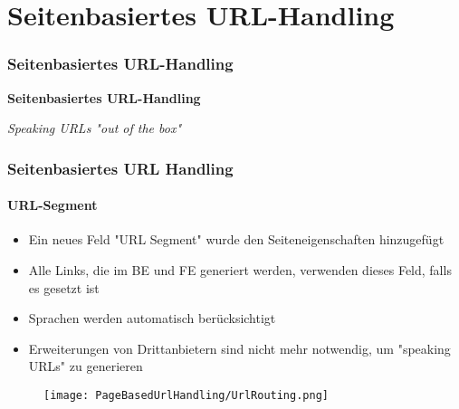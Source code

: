 %

\section{Seitenbasiertes URL-Handling}
\begin{frame}[fragile]
	\frametitle{Seitenbasiertes URL-Handling}

	\begin{center}\huge{\color{typo3darkgrey}\textbf{Seitenbasiertes URL-Handling}}\end{center}
	\begin{center}\large{\textit{Speaking URLs "out of the box"}}\end{center}

\end{frame}


\begin{frame}[fragile]
	\frametitle{Seitenbasiertes URL Handling}
	\framesubtitle{URL-Segment}

	\begin{itemize}
		\item Ein neues Feld "URL Segment" wurde den Seiteneigenschaften hinzugefügt
		\item Alle Links, die im BE und FE generiert werden, verwenden dieses Feld, falls es gesetzt ist
		\item Sprachen werden automatisch berücksichtigt
		\item Erweiterungen von Drittanbietern sind nicht mehr notwendig, um "speaking URLs" zu generieren
	\end{itemize}

	\begin{figure}
		\texttt{[image: PageBasedUrlHandling/UrlRouting.png]}
	\end{figure}


\end{frame}


